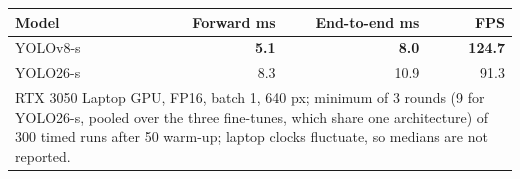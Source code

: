 \begin{tabular}{lrrr}
\toprule
Model & Forward ms & End-to-end ms & FPS \\
\midrule
YOLOv8-s & \textbf{5.1} & \textbf{8.0} & \textbf{124.7} \\
YOLO26-s & 8.3 & 10.9 & 91.3 \\
\bottomrule
\multicolumn{4}{p{\linewidth}}{\footnotesize RTX 3050 Laptop GPU, FP16, batch 1, 640 px; minimum of 3 rounds (9 for YOLO26-s, pooled over the three fine-tunes, which share one architecture) of 300 timed runs after 50 warm-up; laptop clocks fluctuate, so medians are not reported.} \\
\end{tabular}
